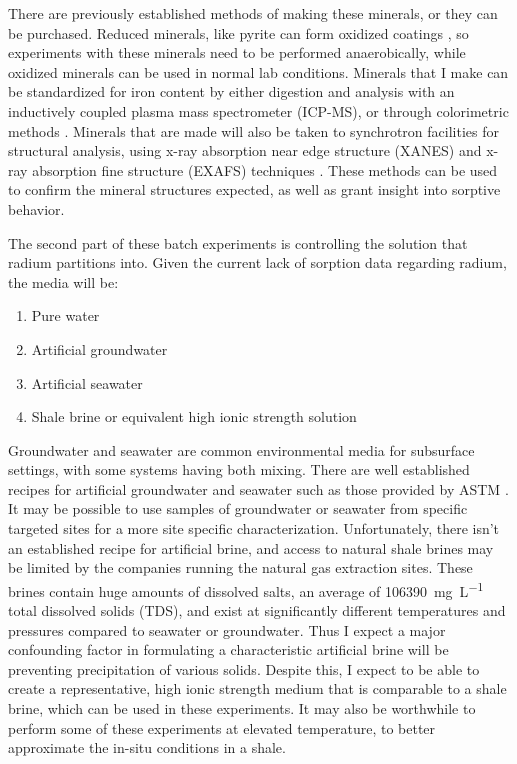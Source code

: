 \documentclass[twoside,12pt,titlepage]{article}
\begin{document}
There are previously established methods of making these minerals, or they can be purchased. Reduced minerals, like pyrite can form oxidized coatings \cite{Buckley1987}, so experiments with these minerals need to be performed anaerobically, while oxidized minerals can be used in normal lab conditions. Minerals that I make can be standardized for iron content by either digestion and analysis with an inductively coupled plasma mass spectrometer (ICP-MS), or through colorimetric methods \cite{Viollier2000}. Minerals that are made will also be taken to synchrotron facilities for structural analysis, using x-ray absorption near edge structure (XANES) and x-ray absorption fine structure (EXAFS) techniques \cite{Fendorf1999}. These methods can be used to confirm the mineral structures expected, as well as grant insight into sorptive behavior.
\par The second part of these batch experiments is controlling the solution that radium partitions into. Given the current lack of sorption data regarding radium, the media will be:

\begin{enumerate}[label = \roman*)]
	\item Pure water
	\item Artificial groundwater
	\item Artificial seawater
	\item Shale brine or equivalent high ionic strength solution
\end{enumerate}

Groundwater and seawater are common environmental media for subsurface settings, with some systems having both mixing. There are well established recipes for artificial groundwater and seawater such as those provided by ASTM \cite{ASTMSeawater2013}. It may be possible to use samples of groundwater or seawater from specific targeted sites for a more site specific characterization. Unfortunately, there isn't an established recipe for artificial brine, and access to natural shale brines may be limited by the companies running the natural gas extraction sites. These brines contain huge amounts of dissolved salts, an average of \SI{106390}{\milli\gram\per\liter} total dissolved solids (TDS), and exist at significantly different temperatures and pressures compared to seawater or groundwater. Thus I expect a major confounding factor in formulating a characteristic artificial brine will be preventing precipitation of various solids. Despite this, I expect to be able to create a representative, high ionic strength medium that is comparable to a shale brine, which can be used in these experiments. It may also be worthwhile to perform some of these experiments at elevated temperature, to better approximate the in-situ conditions in a shale.
\end{document}

